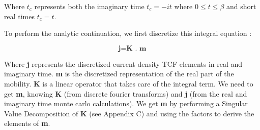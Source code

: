 Where $t_c$ represents both the imaginary time $t_c = -it$ where $0 \leq t \leq \beta$ and short real times $t_c = t$.

To perform the analytic continuation, we first discretize this integral equation :

\begin{equation}
\textbf{j} = \textbf{K . m}
\end{equation}

Where \textbf{j} represents the discretized current density TCF elements in real and imaginary time. \textbf{m} is the discretized representation of the real part of the mobility. \textbf{K} is a linear operator that takes care of the integral term. We need to get \textbf{m}, knowing \textbf{K} (from discrete fourier transforms) and \textbf{j} (from the real and imaginary time monte carlo calculations). We get \textbf{m} by performing a Singular Value Decomposition of \textbf{K} (see Appendix C) and using the factors to derive the elements of \textbf{m}. 







